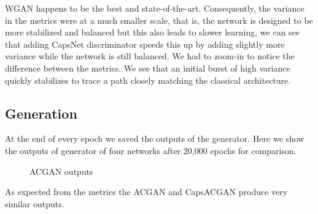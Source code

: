 \documentclass{vldb}
\begin{document}
WGAN happens to be the best and state-of-the-art. Consequently, the variance in the metrics were at a much smaller scale, that is, the network is designed to be more stabilized and balanced but this also leads to slower learning, we can see that adding CapsNet discriminator speeds this up by adding slightly more variance while the network is still balanced. We had to zoom-in to notice the difference between the metrics. We see that an initial burst of high variance quickly stabilizes to trace a path closely matching the classical architecture.
\par\bigskip


\subsection{Generation} %
\label{sec:generation}
At the end of every epoch we saved the outputs of the generator. Here we show the outputs of generator of four networks after 20,000 epochs for comparison.
\begin{figure}[H]
    \centering
    \qquad
    \caption{ACGAN outputs}%
    \label{fig:acgan_gen}%
\end{figure}
As expected from the metrics the ACGAN and CapsACGAN produce very similar outputs.
\end{document}
